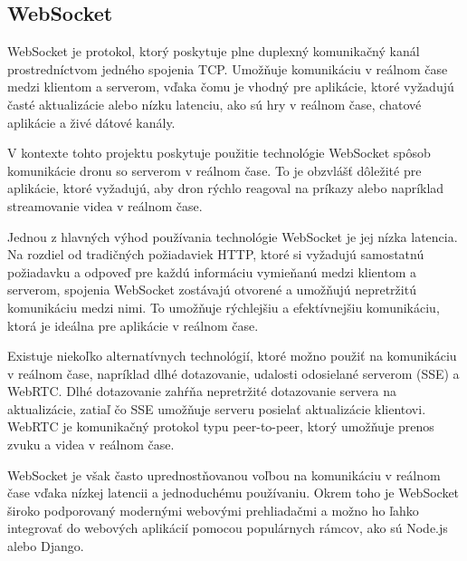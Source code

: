 \subsection{WebSocket}
WebSocket je protokol, ktorý poskytuje plne duplexný komunikačný kanál prostredníctvom jedného spojenia TCP. Umožňuje komunikáciu v reálnom čase medzi klientom a serverom, vďaka čomu je vhodný pre aplikácie, ktoré vyžadujú časté aktualizácie alebo nízku latenciu, ako sú hry v reálnom čase, chatové aplikácie a živé dátové kanály.

V kontexte tohto projektu poskytuje použitie technológie WebSocket spôsob komunikácie dronu so serverom v reálnom čase. To je obzvlášť dôležité pre aplikácie, ktoré vyžadujú, aby dron rýchlo reagoval na príkazy alebo napríklad streamovanie videa v reálnom čase.

Jednou z hlavných výhod používania technológie WebSocket je jej nízka latencia. Na rozdiel od tradičných požiadaviek HTTP, ktoré si vyžadujú samostatnú požiadavku a odpoveď pre každú informáciu vymieňanú medzi klientom a serverom, spojenia WebSocket zostávajú otvorené a umožňujú nepretržitú komunikáciu medzi nimi. To umožňuje rýchlejšiu a efektívnejšiu komunikáciu, ktorá je ideálna pre aplikácie v reálnom čase.

Existuje niekoľko alternatívnych technológií, ktoré možno použiť na komunikáciu v reálnom čase, napríklad dlhé dotazovanie, udalosti odosielané serverom (SSE) a WebRTC. Dlhé dotazovanie zahŕňa nepretržité dotazovanie servera na aktualizácie, zatiaľ čo SSE umožňuje serveru posielať aktualizácie klientovi. WebRTC je komunikačný protokol typu peer-to-peer, ktorý umožňuje prenos zvuku a videa v reálnom čase.

WebSocket je však často uprednostňovanou voľbou na komunikáciu v reálnom čase vďaka nízkej latencii a jednoduchému používaniu. Okrem toho je WebSocket široko podporovaný modernými webovými prehliadačmi a možno ho ľahko integrovať do webových aplikácií pomocou populárnych rámcov, ako sú Node.js alebo Django.






